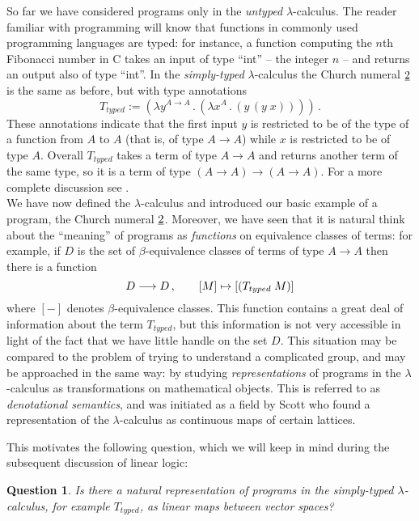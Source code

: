 \documentclass[english,letter paper,12pt,reqno]{article}
\theoremstyle{example}
\newtheorem{question}[theorem]{Question}
\numberwithin{equation}{section}
\begin{document}
So far we have considered programs only in the \emph{untyped} $\lambda$-calculus. The reader familiar with programming will know that functions in commonly used programming languages are typed: for instance, a function computing the $n$th Fibonacci number in C takes an input of type ``int'' -- the integer $n$ -- and returns an output also of type ``int''. In the \emph{simply-typed} $\lambda$-calculus the Church numeral $\underline{2}$ is the same as before, but with type annotations
\[
T_{typed} := ( \lambda y^{A \rightarrow A} \,.\, ( \lambda x^A \,.\, (y \,(y \; x))))\,.
\]
These annotations indicate that the first input $y$ is restricted to be of the type of a function from $A$ to $A$ (that is, of type $A \rightarrow A$) while $x$ is restricted to be of type $A$. Overall $T_{typed}$ takes a term of type $A \rightarrow A$ and returns another term of the same type, so it is a term of type $(A \rightarrow A) \rightarrow (A \rightarrow A)$. For a more complete discussion see \cite[\S 6]{selinger}.
\\

We have now defined the $\lambda$-calculus and introduced our basic example of a program, the Church numeral $\underline{2}$. Moreover, we have seen that it is natural think about the ``meaning'' of programs as \emph{functions} on equivalence classes of terms: for example, if $D$ is the set of $\beta$-equivalence classes of terms of type $A \rightarrow A$ then there is a function
\[
D \longrightarrow D\,, \qquad [M] \mapsto [(T_{typed} \; M)]
\]
where $[-]$ denotes $\beta$-equivalence classes. This function contains a great deal of information about the term $T_{typed}$, but this information is not very accessible in light of the fact that we have little handle on the set $D$. This situation may be compared to the problem of trying to understand a complicated group, and may be approached in the same way: by studying \emph{representations} of programs in the $\lambda$-calculus as transformations on mathematical objects. This is referred to as \emph{denotational semantics}, and was initiated as a field by Scott \cite{scott} who found a representation of the $\lambda$-calculus as continuous maps of certain lattices.

This motivates the following question, which we will keep in mind during the subsequent discussion of linear logic:

\begin{question}\label{question:lambda} Is there a natural representation of programs in the simply-typed $\lambda$-calculus, for example $T_{typed}$, as linear maps between vector spaces?
\end{question}
\end{document}
